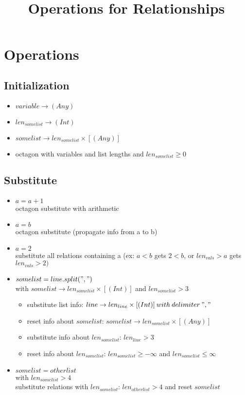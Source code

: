 \documentclass[11pt]{article}
\begin{document}
\title{Operations for Relationships}

\maketitle


\section{Operations}

\subsection{Initialization}


\begin{itemize}
  \item $variable \rightarrow (Any)$
  \item $len_{somelist} \rightarrow (Int)$
  \item $somelist \rightarrow len_{somelist} \times [(Any)]$
  \item octagon with variables and list lengths and $len_{somelist} \geq 0$
\end{itemize}

\subsection{Substitute}

\begin{itemize}
  \item $a = a + 1$\\
  octagon substitute with arithmetic
  \item $a = b$\\
  octagon substitute (propagate info from a to b)
  \item $a = 2$\\
  substitute all relations containing a (ex: $a < b$ gets $2 < b$, or $len_{vals} > a$ gets $len_{vals} > 2)$
  \item $somelist = line.split(",")$\\ with $somelist \rightarrow len_{somelist} \times [(Int)]$ and $len_{somelist} > 3$
  \begin{itemize}
    \item substitute list info: $line \rightarrow len_{line} \times [(Int)]\:with\:delimiter\:","$ 
    \item reset info about $somelist$: $somelist \rightarrow len_{somelist} \times [(Any)]$
    \item substitute info about $len_{somelist}$: $len_{line} > 3$
    \item reset info about $len_{somelist}$: $len_{somelist} \geq -\infty$ and $len_{somelist} \leq \infty$
  \end{itemize}
  \item $somelist = otherlist$\\ with $len_{somelist} > 4$\\
  substitute relations with $len_{somelist}$: $len_{otherlist} > 4$ and reset $somelist$
\end{itemize}
\end{document}
